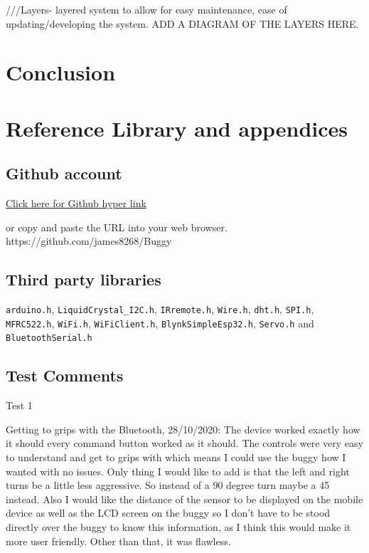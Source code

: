 \documentclass[8pt, a4paper]{article}
\begin{document}
///Layers- layered system to allow for easy maintenance, ease of updating/developing the system. ADD A DIAGRAM OF THE LAYERS HERE. 



\section{Conclusion}


\section{Reference Library and appendices}
\subsection{Github account}

\href{https://github.com/james8268/Buggy}{Click here for Github hyper link} 

or copy and paste the URL into your web browser. https://github.com/james8268/Buggy

\listoffigures

\subsection{Third party libraries}

\verb|arduino.h|, \verb|LiquidCrystal_I2C.h|, \verb|IRremote.h|, \verb|Wire.h|, \verb|dht.h|, \verb|SPI.h|, \verb|MFRC522.h|, \verb|WiFi.h|, \verb|WiFiClient.h|, \verb|BlynkSimpleEsp32.h|, \verb|Servo.h| and \verb|BluetoothSerial.h|



\subsection{Test Comments}
Test 1

Getting to grips with the Bluetooth, 28/10/2020: The device worked exactly how it should every command button worked as it should. The controls were very easy to understand and get to grips with which means I could use the buggy how I wanted with no issues. Only thing I would like to add is that the left and right turns be a little less aggressive. So instead of a 90 degree turn maybe a 45 instead. Also I would like the distance of the sensor to be displayed on the mobile device as well as the LCD screen on the buggy so I don’t have to be stood directly over the buggy to know this information, as I think this would make it more user friendly. Other than that, it was flawless.
\end{document}
